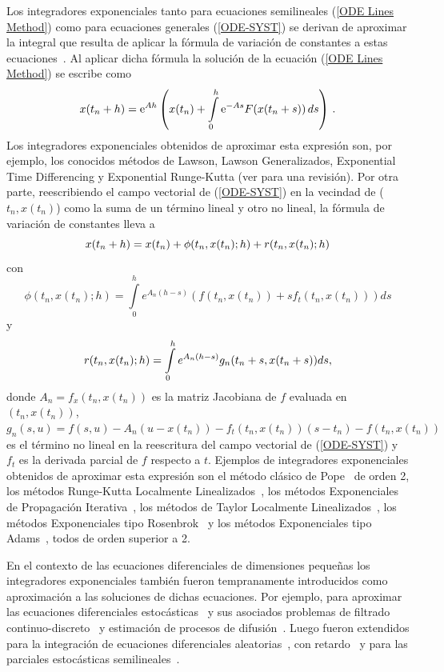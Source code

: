 Los integradores exponenciales tanto para ecuaciones semilineales (\ref{ODE Lines Method}) como para ecuaciones generales (\ref{ODE-SYST}) se derivan de aproximar la integral
que resulta de aplicar la fórmula de variación de constantes a estas ecuaciones~\cite{jimenez2020}. Al aplicar dicha fórmula la solución de la ecuación (\ref{ODE Lines Method}) se escribe como
\begin{equation}
x(t_n+h)=\mathrm{e}^{Ah}\left(x(t_n) +\int\limits_{0}^{h} \mathrm{e}^{-As}F(x(t_n+s)) \,ds\right)\,. \label{VCF2}
\end{equation}
Los integradores exponenciales obtenidos de aproximar esta expresión son, por ejemplo, los conocidos métodos de Lawson, Lawson Generalizados, Exponential Time
Differencing y Exponential Runge-Kutta (ver \cite{Berland07} para una revisión). Por otra parte, reescribiendo el campo vectorial de (\ref{ODE-SYST}) en la vecindad de ($t_n,x(t_n)$) como la suma de un término lineal y otro no lineal, la fórmula de variación de constantes lleva a
\begin{equation}
x(t_{n}+h) =  x(t_{n})+ \phi(t_{n},x(t_{n});h) + \textcolor{black}{r(t_n,x(t_n);h)} \label{VCF-full}
\end{equation}
con
\begin{equation*}
 \phi(t_{n},x(t_{n});h) = \int\limits_{0}^{h}e^{A_{n}(h-s)}(f(t_n,x(t_{n}))+sf_t(t_n,x(t_{n})))ds 
\end{equation*}
y
\begin{equation}
 \textcolor{black}{r(t_n,x(t_n);h)} =  \int\limits_{0}^{h}e^{A_{n}(h-s)}g_{n}(t_{n}+s,x(t_{n}+s))ds, \label{VCF}
\end{equation}
donde $A_{n}=f_x(t_n,x(t_{n}))$ es la matriz Jacobiana de $f$ evaluada en $(t_n,x(t_{n}))$,  $g_{n}(s,u)=f(s,u)-A_{n}(u-x(t_n))-f_t(t_n,x(t_{n}))(s-t_n)-f(t_n,x(t_n))$ es el término no lineal en la reescritura del campo vectorial de (\ref{ODE-SYST}) y $f_t$ es la derivada parcial de $f$ respecto a $t$. 
Ejemplos de integradores exponenciales obtenidos de aproximar esta expresión son el método clásico de Pope~\cite{pope1963exponential} de orden 2, los métodos Runge-Kutta Localmente 
Linealizados~\cite{delaCruz06,Jimenez13,Jimenez14AMC}, los métodos Exponenciales de Propagación 
Iterativa~\cite{tokman2006efficient, tokman2012new}, los métodos de Taylor Localmente Linealizados~\cite{delaCruz07}, los
métodos Exponenciales tipo Rosenbrok~\cite{hochbruck2009exponential} y los métodos Exponenciales tipo Adams~\cite{hochbruck2011exponential}, todos de orden superior a 2.

En el contexto de las ecuaciones diferenciales de dimensiones pequeñas los integradores exponenciales también fueron tempranamente introducidos como aproximación a las soluciones de dichas ecuaciones. Por ejemplo, para aproximar las ecuaciones diferenciales estocásticas~\cite{ozaki19852,ozaki1985statistical} y sus asociados problemas de filtrado continuo-discreto~\cite{ozaki1993local} y estimación de procesos de difusión~\cite{ozaki19852,ozaki1985statistical,ozaki1994local}. Luego fueron extendidos para la integración de ecuaciones diferenciales aleatorias~\cite{carbonell2005local}, con retardo~\cite{jimenez2006local} y para las parciales estocásticas semilineales~\cite{jentzen2009overcoming,kloeden2011exponential}.

